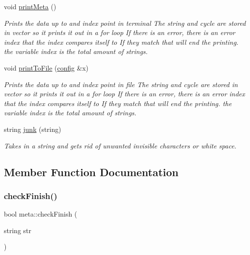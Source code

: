 \begin{DoxyCompactItemize}
void \mbox{\hyperlink{classmeta_ac2960b98bde11f9bbd438e81ebff9f4b}{print\+Meta}} ()
\begin{DoxyCompactList}\small\item\em Prints the data up to and index point in terminal The string and cycle are stored in vector so it prints it out in a for loop If there is an error, there is an error index that the index compares itself to If they match that will end the printing. the variable index is the total amount of strings. \end{DoxyCompactList}\item 
\mbox{\label{classmeta_a0ab4d89d4697d5b546bba28032ef218f}} 
void \mbox{\hyperlink{classmeta_a0ab4d89d4697d5b546bba28032ef218f}{print\+To\+File}} (\mbox{\hyperlink{classconfig}{config}} \&x)
\begin{DoxyCompactList}\small\item\em Prints the data up to and index point in file The string and cycle are stored in vector so it prints it out in a for loop If there is an error, there is an error index that the index compares itself to If they match that will end the printing. the variable index is the total amount of strings. \end{DoxyCompactList}\item 
string \mbox{\hyperlink{classmeta_a5cf6aca232b3f8cfb979e385803167cd}{junk}} (string)
\begin{DoxyCompactList}\small\item\em Takes in a string and gets rid of unwanted invisible characters or white space. \end{DoxyCompactList}\end{DoxyCompactItemize}


\subsection{Member Function Documentation}
\mbox{\label{classmeta_a058e013c346255e0e29a6d8996a26d5d}} 
\subsubsection{\texorpdfstring{checkFinish()}{checkFinish()}}
{\footnotesize\ttfamily bool meta\+::check\+Finish (\begin{DoxyParamCaption}\item[{string}]{str }\end{DoxyParamCaption})}



